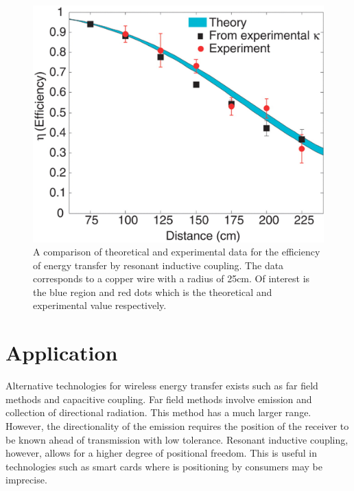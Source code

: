 \documentclass[a4paper,justified,nobib]{tufte-handout}
\begin{document}
\begin{figure}
  \includegraphics[scale=0.22]{images/Experimental.jpg}
  \caption{A comparison of theoretical and experimental data for the efficiency
  of energy transfer by resonant inductive coupling.
  The data corresponds to a copper wire with a radius of 25cm.
  Of interest is the blue region and red dots which is the theoretical
  and experimental value respectively.\cite{StrongCouple}}
  \label{fig:efficiency}
\end{figure}

\section{Application}

Alternative technologies for wireless energy transfer exists such as far field methods
and capacitive coupling.
Far field methods involve emission and collection of directional radiation.
This method has a much larger range.
However, the directionality of the emission requires the position of the receiver to
be known ahead of transmission with low tolerance.
Resonant inductive coupling, however, allows for a higher degree of positional freedom.
This is useful in technologies such as smart cards where is positioning by consumers
may be imprecise.
\end{document}

